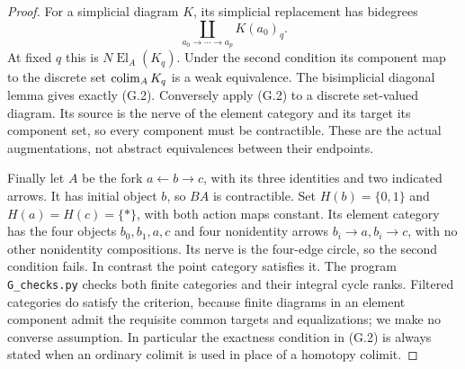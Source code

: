 \begin{proof}
For a simplicial diagram $K$, its simplicial replacement has bidegrees
\[
 \coprod_{a_0\to\cdots\to a_p}K(a_0)_q.
\]
At fixed $q$ this is $N\operatorname{El}_A(K_q)$. Under the second
condition its component map to the discrete set $\operatorname*{colim}_AK_q$ is a
weak equivalence. The bisimplicial diagonal lemma gives exactly (G.2).
Conversely apply (G.2) to a discrete set-valued diagram. Its source is
the nerve of the element category and its target its component set, so
every component must be contractible. These are the actual
augmentations, not abstract equivalences between their endpoints.

Finally let $A$ be the fork $a\leftarrow b\to c$, with its three
identities and two indicated arrows. It has initial object $b$, so
$BA$ is contractible. Set $H(b)=\{0,1\}$ and
$H(a)=H(c)=\{*\}$, with both action maps constant. Its element category
has the four objects $b_0,b_1,a,c$ and four nonidentity arrows
$b_i\to a,b_i\to c$, with no other nonidentity compositions. Its nerve
is the four-edge circle, so the second condition fails. In contrast
the point category satisfies it. The program \texttt{G\_checks.py}
checks both finite categories and their integral cycle ranks. Filtered
categories do satisfy the criterion, because finite diagrams in an
element component admit the requisite common targets and equalizations;
we make no converse assumption. In particular the exactness condition
in (G.2) is always stated when an ordinary colimit is used in place of
a homotopy colimit.
\end{proof}

